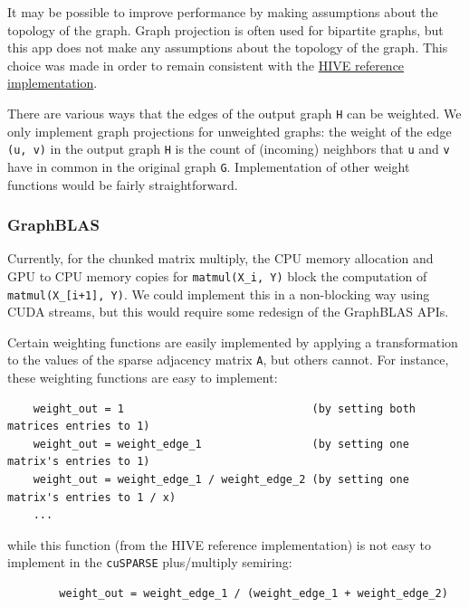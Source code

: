 \documentclass[10pt,oneside]{memoir}
\begin{document}
It may be possible to improve performance by making assumptions about
the topology of the graph. Graph projection is often used for bipartite
graphs, but this app does not make any assumptions about the topology of
the graph. This choice was made in order to remain consistent with the
\href{https://hiveprogram.com/wiki/display/WOR/V0+-+Application+Classification}{HIVE
reference implementation}.

There are various ways that the edges of the output graph \texttt{H} can
be weighted. We only implement graph projections for unweighted graphs:
the weight of the edge \texttt{(u,\ v)} in the output graph \texttt{H}
is the count of (incoming) neighbors that \texttt{u} and \texttt{v} have
in common in the original graph \texttt{G}. Implementation of other
weight functions would be fairly straightforward.

\hypertarget{graphblas-2}{%
\subsubsection{GraphBLAS}\label{graphblas-2}}

Currently, for the chunked matrix multiply, the CPU memory allocation
and GPU to CPU memory copies for \texttt{matmul(X\_i,\ Y)} block the
computation of \texttt{matmul(X\_{[}i+1{]},\ Y)}. We could implement
this in a non-blocking way using CUDA streams, but this would require
some redesign of the GraphBLAS APIs.

Certain weighting functions are easily implemented by applying a
transformation to the values of the sparse adjacency matrix \texttt{A},
but others cannot. For instance, these weighting functions are easy to
implement:

\begin{verbatim}
    weight_out = 1                             (by setting both matrices entries to 1)
    weight_out = weight_edge_1                 (by setting one matrix's entries to 1)
    weight_out = weight_edge_1 / weight_edge_2 (by setting one matrix's entries to 1 / x)
    ...
\end{verbatim}

while this function (from the HIVE reference implementation) is not easy
to implement in the \texttt{cuSPARSE} plus/multiply semiring:

\begin{verbatim}
        weight_out = weight_edge_1 / (weight_edge_1 + weight_edge_2)
\end{verbatim}
\end{document}
